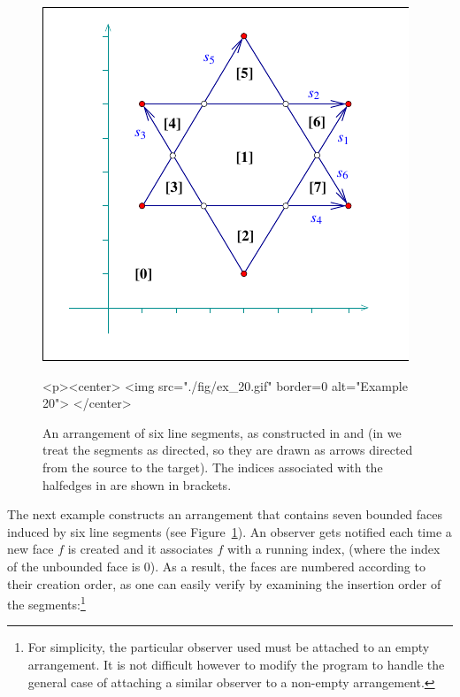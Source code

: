 \begin{figure}[t]
\begin{ccTexOnly}
  \begin{center}
  \includegraphics{Arrangement_2/fig/ex_20}
  \end{center}
\end{ccTexOnly}
\begin{ccHtmlOnly}
  <p><center>
  <img src="./fig/ex_20.gif" border=0 alt="Example 20">
  </center>
\end{ccHtmlOnly}
\caption{An arrangement of six line segments, as constructed in
 and 
(in  we treat
the segments as directed, so they are drawn as arrows directed from the
source to the target). The indices associated with the halfedges in
 are shown in brackets.\label{arr_fig:ex_20}}
\end{figure}

The next example constructs an arrangement that contains seven bounded 
faces induced by six line segments (see Figure~\ref{arr_fig:ex_20}). An 
observer gets notified each time a new face $f$ is created and it associates 
$f$ with a running index, (where the index of the unbounded face
is 0). As a result, the faces are numbered according to their creation
order, as one can easily verify by examining the insertion order of the
segments:\footnote{For simplicity, the particular observer used must be
attached to an empty arrangement. It is not difficult however to modify 
the program to handle the general case of attaching a similar observer
to a non-empty arrangement.}

